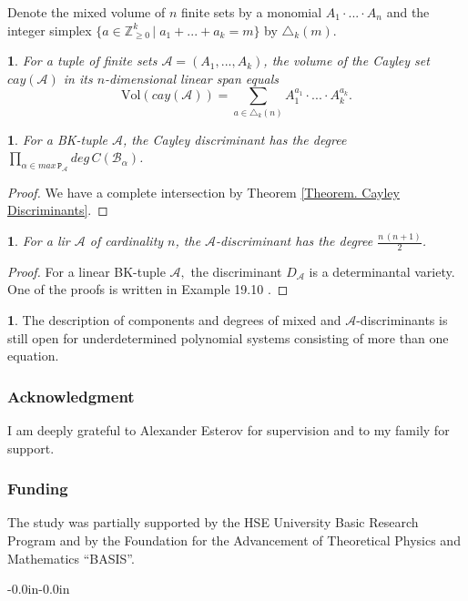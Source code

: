 \documentclass[11pt]{article}
\theoremstyle{plain}
\theoremstyle{definition}
\theoremstyle{remark}
\theoremstyle{plain}
\theoremstyle{plain}
\newtheorem{prop}[thm]{\protect\propositionname}
\theoremstyle{plain}
\newtheorem{cor}[thm]{\protect\corollaryname}
\theoremstyle{definition}
\newtheorem*{problem*}{\protect\problemname}
\providecommand{\corollaryname}{Corollary}
\providecommand{\problemname}{Problem}
\providecommand{\propositionname}{Proposition}
\begin{document}
Denote the mixed volume of $n$ finite sets by a monomial $A_{1}\cdot...\cdot A_{n}$
and the integer simplex $\{a\in\mathbb{Z}_{\geq0}^{k}\,|\;a_{1}+...+a_{k}=m\}$
by $\triangle_{k}(m)$.
\begin{cor}
\textup{\cite{esterov_newton_2010}} For a tuple of finite sets $\mathscr{A}=(A_{1},...,A_{k})$,
the volume of the Cayley set $cay(\mathscr{A})$ in its $n$-dimensional
linear span equals
\[
\mathrm{Vol}(cay(\mathscr{A}))=\underset{a\in\triangle_{k}(n)}{\sum}A_{1}^{a_{1}}\cdot...\cdot A_{k}^{a_{k}}.
\]
\end{cor}

\begin{cor}
\label{Corollary. Degree of the Cayley discriminant for a BK-tuple}For
a BK-tuple $\mathscr{A}$, the Cayley discriminant has the degree
$\underset{\alpha\in max\,\mathtt{P}_{\mathscr{A}}}{\prod}deg\,C(\mathscr{B}_{\alpha})$.
\end{cor}

\begin{proof}
We have a complete intersection by Theorem \ref{Theorem. Cayley Discriminants}.
\end{proof}
\begin{prop}
For a lir $\mathscr{A}$ of cardinality $n$, the $\mathscr{A}$-discriminant
has the degree $\frac{n\,(n+1)}{2}$.
\end{prop}

\begin{proof}
For a linear BK-tuple $\mathscr{A},$ the discriminant $D_{\mathscr{A}}$
is a determinantal variety. One of the proofs is written in Example
19.10 \cite{harris_algebraic_1992}.
\end{proof}
\begin{problem*}
The description of components and degrees of mixed and $\mathscr{A}$-discriminants
is still open for underdetermined polynomial systems consisting of
more than one equation.
\end{problem*}

\subsubsection*{Acknowledgment}

I am deeply grateful to Alexander Esterov for supervision and to my
family for support.

\subsubsection*{Funding}

The study was partially supported by the HSE University Basic Research
Program and by the Foundation for the Advancement of Theoretical Physics
and Mathematics \textquotedblleft BASIS\textquotedblright .

\begin{adjustwidth}{-0.0in}{-0.0in}
	\sloppy
	\printbibliography
	\fussy
\end{adjustwidth}
\end{document}
